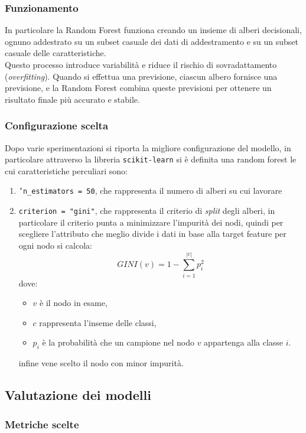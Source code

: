 \documentclass[italian,12pt,a4paper]{article}
\begin{document}
	\subsubsection{Funzionamento}
	In particolare la Random Forest funziona creando un insieme di alberi decisionali, ognuno addestrato su un subset casuale dei dati di addestramento e su un subset casuale delle caratteristiche.\\
	Questo processo introduce variabilità e riduce il rischio di sovradattamento (\textit{overfitting}). Quando si effettua una previsione, ciascun albero fornisce una previsione, e la Random Forest combina queste previsioni per ottenere un risultato finale più accurato e stabile.
	\subsubsection{Configurazione scelta}
	Dopo varie sperimentazioni si riporta la migliore configurazione del modello, in particolare attraverso la libreria \texttt{scikit-learn} \cite{scikit_learn} si è definita una random forest le cui caratteristiche perculiari sono:
		\begin{enumerate}
			\item \texttt{'n\_estimators = 50}, che rappresenta il numero di alberi su cui lavorare
			\item  \texttt{criterion = "gini"}, che rappresenta il criterio di \textit{split} degli alberi, in particolare il criterio punta a minimizzare l'impurità dei nodi, quindi per scegliere l'attributo che meglio divide i dati in base alla target feature per ogni nodo si calcola:
				$$GINI(v) = 1-\sum_{i = 1}^{|c|}p_i^2$$
			dove:
				\begin{itemize}
					\item $v$ è il nodo in esame,
					\item $c$ rappresenta l'inseme delle classi,
					\item $p_i$ è la probabilità che un campione nel nodo $v$ appartenga alla classe $i$.
				\end{itemize}
			infine vene scelto il nodo con minor impurità.
		\end{enumerate}
	
	\subsection{Valutazione dei modelli}

	
	\subsubsection{Metriche scelte}
\end{document}

